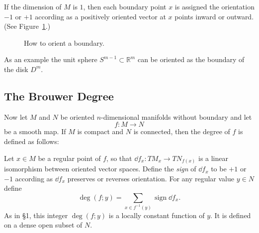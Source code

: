 If the dimension of $M$ is $1$, then each boundary point $x$ is assigned the orientation $-1$ or $+1$ according as a positively oriented vector at $x$ points inward or outward. (See Figure~\ref{fig:milnor-08}.)

\begin{figure}[htbp]
\centering
\setcounter{figure}{7}%
\caption{How to orient a boundary.}\label{fig:milnor-08}
\end{figure}

As an example the unit sphere $S^{m-1} \subset \mathbb{R}^m$ can be oriented as the boundary of the disk $D^m$.

\subsection{The Brouwer Degree}

Now let $M$ and $N$ be oriented $n$-dimensional manifolds without boundary and let
\[
f : M \to N
\]
be a smooth map. If $M$ is compact and $N$ is connected, then the degree of $f$ is defined as follows:

Let $x \in M$ be a regular point of $f$, so that $\dd f_x : TM_x \to TN_{f(x)}$ is a linear isomorphism between oriented vector spaces. Define the \emph{sign} of $\dd f_x$ to be $+1$ or $-1$ according as $\dd f_x$ preserves or reverses orientation. For any regular value $y \in N$ define
\[
\deg(f; y) = \sum_{x \in f^{-1}(y)} \operatorname{sign} \dd f_x.
\]
As in §1, this integer $\deg(f; y)$ is a locally constant function of $y$. It is defined on a dense open subset of $N$.

